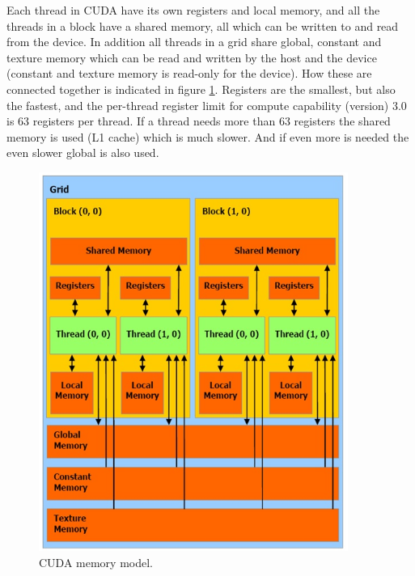 Each thread in CUDA have its own registers and local memory, and all the threads in a block have a shared memory, all which can be written to and read from the device. In addition all threads in a grid share global, constant and texture memory which can be read and written by the host and the device (constant and texture memory is read-only for the device). How these are connected together is indicated in figure \ref{CUDAMemModel}. Registers are the smallest, but also the fastest, and the per-thread register limit for compute capability (version) 3.0 is 63 registers per thread. If a thread needs more than 63 registers the shared memory is used (L1 cache) which is much slower. And if even more is needed the even slower global is also used.

\begin{figure}[h!]
\centering
\includegraphics[width=0.90\textwidth]{backgroundTheory/parallel/CUDAMemModel}
\caption{CUDA memory model.}
\label{CUDAMemModel}
\end{figure} 

